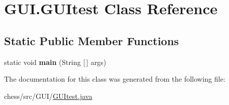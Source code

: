 \hypertarget{class_g_u_i_1_1_g_u_itest}{}\section{G\+U\+I.\+G\+U\+Itest Class Reference}
\label{class_g_u_i_1_1_g_u_itest}
\subsection*{Static Public Member Functions}
\begin{DoxyCompactItemize}
\item 
\mbox{\label{class_g_u_i_1_1_g_u_itest_a044f5cc2ee1d31bdc8404990f8e9efd4}} 
static void {\bfseries main} (String \mbox{[}$\,$\mbox{]} args)
\end{DoxyCompactItemize}


The documentation for this class was generated from the following file\+:\begin{DoxyCompactItemize}
\item 
chess/src/\+G\+U\+I/\mbox{\hyperlink{_g_u_itest_8java}{G\+U\+Itest.\+java}}\end{DoxyCompactItemize}
